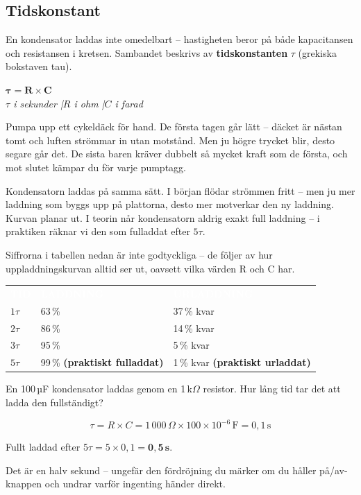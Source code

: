 \documentclass[a4paper,11pt,twoside]{book}
\newcommand{\emoji}[1]{{\emojifont #1}}
\newcommand{\tblhdr}[1]{\cellcolor{greydark}\textcolor{white}{\headingfont\bfseries\footnotesize\MakeUppercase{#1}}}
\begin{document}
\subsection{Tidskonstant}

En kondensator laddas inte omedelbart -- hastigheten beror 
på både kapacitansen och resistansen i kretsen. Sambandet 
beskrivs av \textbf{tidskonstanten} $\tau$ (grekiska 
bokstaven tau).

\begin{formulabox}
{\large$\mathbf{\tau = R \times C}$}\\[3mm]
{\small\normalfont\itshape $\tau$ i sekunder \quad|\quad $R$ i ohm \quad|\quad $C$ i farad}
\end{formulabox}

\begin{storybox}[{\emoji{🚲} Cykeldäcket}]
Pumpa upp ett cykeldäck för hand. De första tagen går 
lätt -- däcket är nästan tomt och luften strömmar in 
utan motstånd. Men ju högre trycket blir, desto segare 
går det. De sista baren kräver dubbelt så mycket kraft 
som de första, och mot slutet kämpar du för varje 
pumptagg.

Kondensatorn laddas på samma sätt. I början flödar 
strömmen fritt -- men ju mer laddning som byggs upp på 
plattorna, desto mer motverkar den ny laddning. Kurvan 
planar ut. I teorin når kondensatorn aldrig exakt full 
laddning -- i praktiken räknar vi den som fulladdat 
efter $5\tau$.
\end{storybox}

Siffrorna i tabellen nedan är inte godtyckliga -- de följer 
av hur uppladdningskurvan alltid ser ut, oavsett vilka 
värden R och C har.

\begin{center}
\begin{tabular}{lll}
\rowcolor{greydark}
\tblhdr{Tid} & \tblhdr{Laddning} & \tblhdr{Urladdning} \\
$1\tau$ & 63\,\% & 37\,\% kvar \\
\rowcolor{greylight}
$2\tau$ & 86\,\% & 14\,\% kvar \\
$3\tau$ & 95\,\% &  5\,\% kvar \\
\rowcolor{greylight}
$5\tau$ & 99\,\% \textbf{(praktiskt fulladdat)} & 1\,\% kvar \textbf{(praktiskt urladdat)} \\
\end{tabular}
\end{center}

\begin{worked}[title={Räkneexempel 1.4.4-1 -- Avkopplingskondensator}]
En 100\,µF kondensator laddas genom en 1\,k$\Omega$ 
resistor. Hur lång tid tar det att ladda den fullständigt?

\[ \tau = R \times C = 1\,000\,\Omega \times 100 \times 10^{-6}\,\text{F} = 0{,}1\,\text{s} \]

Fullt laddad efter $5\tau = 5 \times 0{,}1 = \mathbf{0{,}5\,\text{s}}$.

Det är en halv sekund -- ungefär den fördröjning du märker om du håller 
på/av-knappen och undrar varför ingenting händer direkt.
\end{worked}
\end{document}
